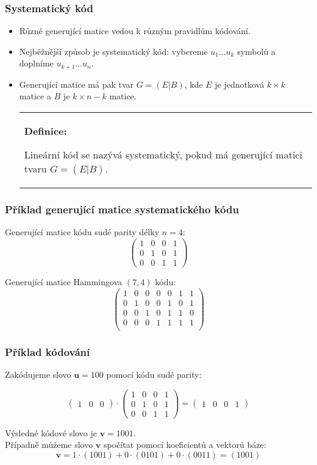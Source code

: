 \documentclass{beamer}
\newenvironment{definice}
{
    \begin{center}
    \begin{tabular}{p{9cm}}
    \textbf{Definice:}
}
{
    \end{tabular}
    \end{center}
}
\newcommand{\vu}{\textbf{u}}
\newcommand{\vv}{\textbf{v}}
\newcommand{\emptyline}{\\$\,$\\}
\newenvironment{itemizex}%
  {\large \begin{itemize}%
    \setlength{\itemsep}{8pt}%
    \setlength{\parskip}{8pt}}%
  {\end{itemize}}
\begin{document}
\begin{frame}[t,fragile]\frametitle{Systematický kód} 
    \begin{itemizex}
        \item Různé generující matice vedou k různým pravidlům kódování.
        \item Nejběžnější způsob je systematický kód: vybereme $u_1\dots u_k$ symbolů a doplníme $u_{k+1}\dots u_{n}$.
        \item Generující matice má pak tvar $G=(E|B)$, kde $E$ je jednotková $k\times k$ matice a $B$ je $k\times n-k$ matice. 
    \begin{definice}
    Lineární kód se nazývá systematický, pokud má generující matici tvaru $G=(E|B)$.
    \end{definice}
    \end{itemizex}
\end{frame}


\begin{frame}[t,fragile]\frametitle{Příklad generující matice systematického kódu} 
Generující matice kódu sudé parity délky $n=4$:
$$
\begin{pmatrix}
1&0&0&1\\
0&1&0&1\\
0&0&1&1
\end{pmatrix}
$$

Generující matice Hammingova $(7,4)$ kódu:
$$
\begin{pmatrix}
1&0&0&0&0&1&1\\
0&1&0&0&1&0&1\\
0&0&1&0&1&1&0\\
0&0&0&1&1&1&1\\
\end{pmatrix}
$$
\end{frame}


\begin{frame}[t,fragile]\frametitle{Příklad kódování} 
Zakódujeme slovo $\vu=100$ pomocí kódu sudé parity:

$$
\begin{pmatrix}
1&0&0
\end{pmatrix}
\cdot
\begin{pmatrix}
1&0&0&1\\
0&1&0&1\\
0&0&1&1
\end{pmatrix}
=
\begin{pmatrix}
1&0&0&1
\end{pmatrix}
$$

Výsledné kódové slovo je $\vv=1001$. 
\emptyline
Případně můžeme slovo $\vv$ spočítat pomocí koeficientů a vektorů báze:
$$
\vv=1\cdot(1001)+0\cdot(0101)+0\cdot(0011)=(1001)
$$
\end{frame}
\end{document}
